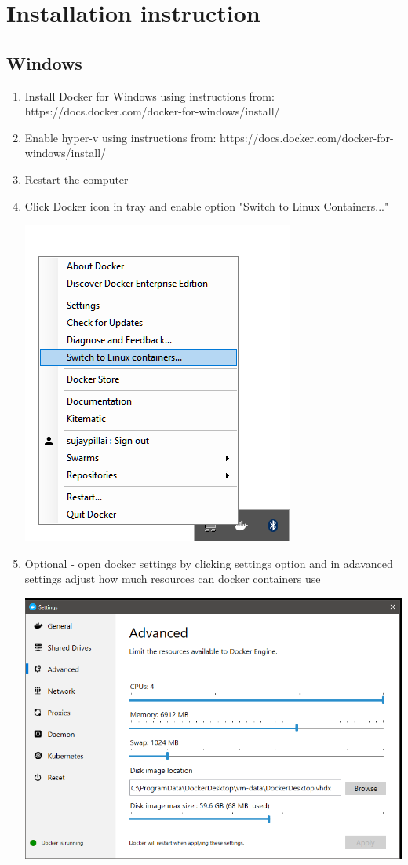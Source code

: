 \chapter{Installation instruction}
\section{Windows}
\begin{enumerate}
    \item Install Docker for Windows using instructions from: \newline
    https://docs.docker.com/docker-for-windows/install/
    \item Enable hyper-v using instructions from: \newline
    https://docs.docker.com/docker-for-windows/install/
    \item Restart the computer
    \item Click Docker icon in tray and enable option "Switch to Linux Containers..." \newline
        \begin{minipage}{\linewidth}
            \centering
        	\includegraphics[width=0.4\linewidth]{instructions/systemtray.png}
        \end{minipage}
    \item Optional - open docker settings by clicking settings option and  in adavanced settings adjust how much resources can docker containers use
        \begin{minipage}{\linewidth}
            \centering
        	\includegraphics[width=0.4\linewidth]{instructions/res.PNG}

\end{minipage}
\end{enumerate}
